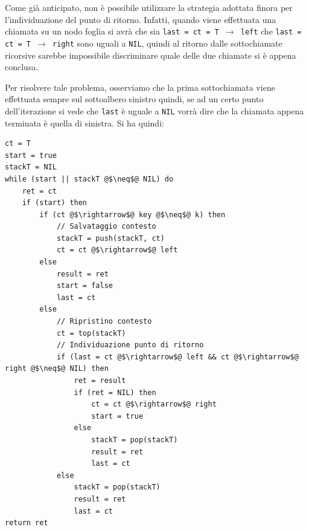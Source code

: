 Come già anticipato, non è possibile utilizzare la strategia adottata finora per l'individuazione del punto di ritorno. Infatti, quando viene effettuata una chiamata su un nodo foglia si avrà che sia \texttt{last = ct = T $\rightarrow$ left} che \texttt{last = ct = T $\rightarrow$ right} sono uguali a \texttt{NIL}, quindi al ritorno dalle sottochiamate ricorsive sarebbe impossibile discriminare quale delle due chiamate si è appena conclusa.
\begin{center}
\end{center}
Per risolvere tale problema, osserviamo che la prima sottochiamata viene effettuata sempre sul sottoalbero sinistro quindi, se ad un certo punto dell'iterazione si vede che \texttt{last} è uguale a \texttt{NIL} vorrà dire che la chiamata appena terminata è quella di sinistra. Si ha quindi:
\begin{lstlisting}[caption={\textsc{Search\_Iter}(T,k)},language=asd]
ct = T
start = true
stackT = NIL
while (start || stackT @$\neq$@ NIL) do
	ret = ct
	if (start) then
		if (ct @$\rightarrow$@ key @$\neq$@ k) then
			// Salvataggio contesto
			stackT = push(stackT, ct)
			ct = ct @$\rightarrow$@ left
		else
			result = ret
			start = false
			last = ct
		else
			// Ripristino contesto
			ct = top(stackT)
			// Individuazione punto di ritorno
			if (last = ct @$\rightarrow$@ left && ct @$\rightarrow$@ right @$\neq$@ NIL) then
				ret = result
				if (ret = NIL) then
					ct = ct @$\rightarrow$@ right
					start = true
				else
					stackT = pop(stackT)
					result = ret
					last = ct
			else
				stackT = pop(stackT)
				result = ret
				last = ct
return ret
\end{lstlisting}

